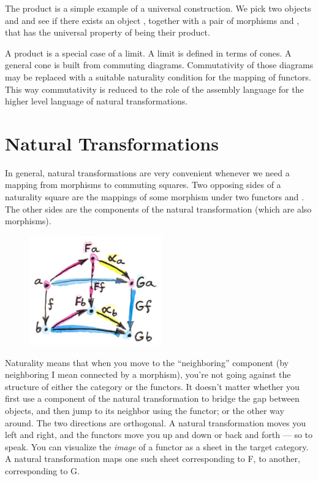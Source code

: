 The product is a simple example of a universal construction. We pick two
objects  and  and see if there exists an object
, together with a pair of morphisms  and ,
that has the universal property of being their product.

A product is a special case of a limit. A limit is defined in terms of
cones. A general cone is built from commuting diagrams. Commutativity of
those diagrams may be replaced with a suitable naturality condition for
the mapping of functors. This way commutativity is reduced to the role
of the assembly language for the higher level language of natural
transformations.

\section{Natural Transformations}\label{natural-transformations}

In general, natural transformations are very convenient whenever we need
a mapping from morphisms to commuting squares. Two opposing sides of a
naturality square are the mappings of some morphism  under two
functors  and . The other sides are the components
of the natural transformation (which are also morphisms).

\begin{figure}[H]
\centering
\includegraphics[width=2.25000in]{images/3_naturality.jpg}
\end{figure}

\noindent
Naturality means that when you move to the ``neighboring'' component (by
neighboring I mean connected by a morphism), you're not going against
the structure of either the category or the functors. It doesn't matter
whether you first use a component of the natural transformation to
bridge the gap between objects, and then jump to its neighbor using the
functor; or the other way around. The two directions are orthogonal. A
natural transformation moves you left and right, and the functors move
you up and down or back and forth --- so to speak. You can visualize the
\emph{image} of a functor as a sheet in the target category. A natural
transformation maps one such sheet corresponding to F, to another,
corresponding to G.

